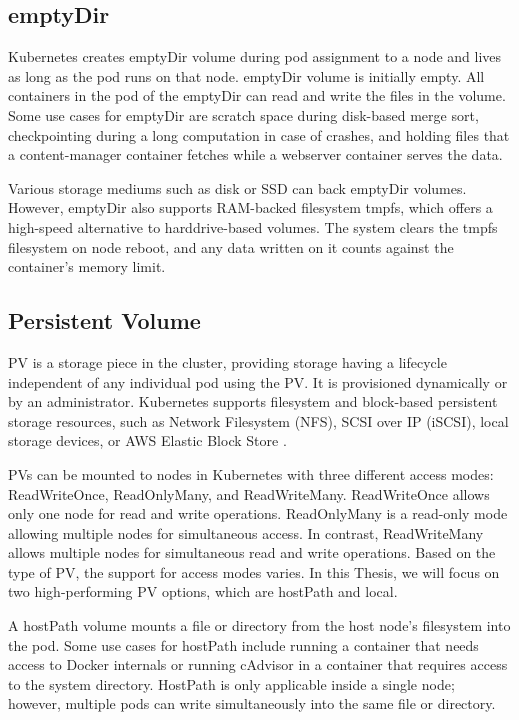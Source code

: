 \subsection{emptyDir}

Kubernetes creates emptyDir volume during pod assignment to a node and lives as long as the pod runs on that node. emptyDir volume is initially empty. All containers in the pod of the emptyDir can read and write the files in the volume. Some use cases for emptyDir are scratch space during disk-based merge sort, checkpointing during a long computation in case of crashes, and holding files that a content-manager container fetches while a webserver container serves the data. \cite{VolumesKubernetes}

Various storage mediums such as disk or SSD can back emptyDir volumes. However, emptyDir also supports RAM-backed filesystem tmpfs, which offers a high-speed alternative to harddrive-based volumes. The system clears the tmpfs filesystem on node reboot, and any data written on it counts against the container's memory limit. \cite{VolumesKubernetes}

\subsection{Persistent Volume}

PV is a storage piece in the cluster, providing storage having a lifecycle independent of any individual pod using the PV. It is provisioned dynamically or by an administrator. Kubernetes supports filesystem and block-based persistent storage resources, such as Network Filesystem (NFS), SCSI over IP (iSCSI), local storage devices, or AWS Elastic Block Store \cite{AmazonEBS}.\cite{PV}

PVs can be mounted to nodes in Kubernetes with three different access modes: ReadWriteOnce, ReadOnlyMany, and ReadWriteMany. ReadWriteOnce allows only one node for read and write operations. ReadOnlyMany is a read-only mode allowing multiple nodes for simultaneous access. In contrast, ReadWriteMany allows multiple nodes for simultaneous read and write operations. Based on the type of PV, the support for access modes varies. In this Thesis, we will focus on two high-performing PV options, which are hostPath and local. \cite{PV} 

A hostPath volume mounts a file or directory from the host node's filesystem into the pod. Some use cases for hostPath include running a container that needs access to Docker internals or running cAdvisor in a container that requires access to the system directory. HostPath is only applicable inside a single node; however, multiple pods can write simultaneously into the same file or directory.

